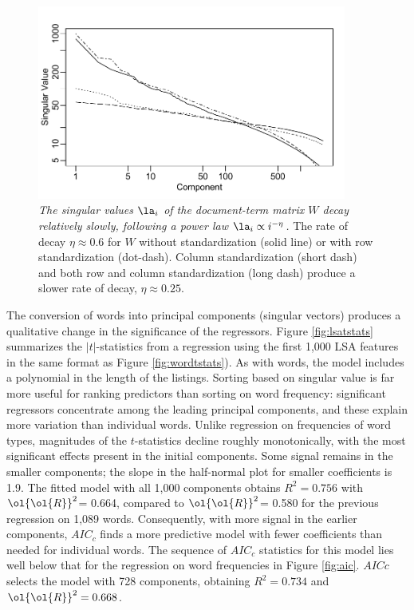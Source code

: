 \documentclass[12pt]{article}
\newcommand{\prs}{\mbox{$\ol{\ol{R}}^2$}}
\begin{document}
 \begin{figure}
 \caption{ 
 	\label{fig:spectrum}
	{\sl The singular values $\la_i$ of the document-term matrix $W$ decay
 relatively slowly, following a power law $\la_i \propto i^{-\eta}$.  } The rate
 of decay $\eta \approx 0.6$ for $W$ without standardization (solid line) or
 with row standardization (dot-dash). Column standardization (short dash) and
 both row and column standardization (long dash) produce a slower rate of decay,
 $\eta \approx 0.25$.}  \centerline{
 \vspace{0.1in}
 \includegraphics[width=4in]{figures/spectrum} }
 \vspace{0.2in}
 \end{figure}
   

 The conversion of words into principal components (singular vectors) produces
 a qualitative change in
 the significance of the regressors.  Figure \ref{fig:lsatstats} summarizes the
 $|t|$-statistics from a regression using the first 1,000 LSA  features
 in the same format as Figure \ref{fig:wordtstats}).  As with words, the model
 includes a polynomial in the length of the listings.   Sorting based on singular value is far more
 useful for ranking predictors than sorting on word frequency:  significant regressors  concentrate among the leading principal components, and these explain more variation than individual words. Unlike regression on
 frequencies of word types,  magnitudes of the 
 $t$-statistics decline roughly monotonically, with the most
 significant effects present in the initial components. Some signal remains in the smaller components; the slope in the
 half-normal plot for smaller coefficients is 1.9.  The fitted model with all 1,000 
 components obtains $R^2 = 0.756$
 with \prs = 0.664, compared to \prs = 0.580 for the previous regression on
 1,089 words.  Consequently, with more signal in the earlier components, $AIC_c$
 finds a more predictive model with fewer coefficients than needed for
 individual words.  The sequence of $AIC_c$ statistics for this model lies well
 below that for the regression on word frequencies in Figure \ref{fig:aic}.
  $AICc$ selects the model with 728 components, obtaining $R^2 = 0.734$
 and $\prs = 0.668$.
 
\end{document}
